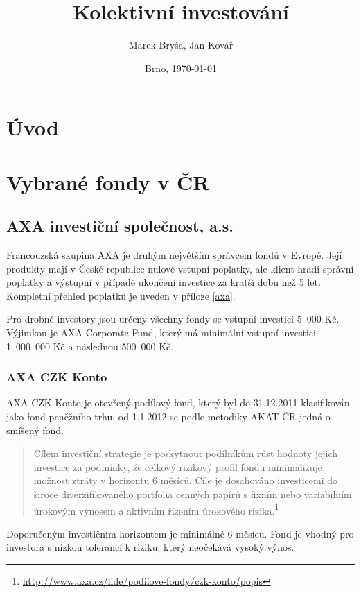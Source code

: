 \documentclass[a4paper,12pt]{article}
\title{Kolektivní investování}
\author{Marek Bryša, Jan Kovář}
\date{Brno, \today}
\begin{document}
\maketitle

\section{Úvod}

\section{Vybrané fondy v ČR}
	\subsection{AXA investiční společnost, a.s.}
		Francouzská skupina AXA je druhým největším správcem fondů v Evropě.\cite{axa_about} Její produkty mají v České republice nulové vstupní poplatky, ale klient hradí správní poplatky a výstupní v případě ukončení investice za kratší dobu než 5 let. Kompletní přehled poplatků je uveden v příloze \ref{axa}.
		
		Pro drobné investory jsou určeny všechny fondy se vstupní investicí 5~000 Kč. Výjimkou je AXA Corporate Fund, který má minimální vstupní investici 1~000~000 Kč a následnou 500~000 Kč.
		
		\subsubsection{AXA CZK Konto}
			AXA CZK Konto je otevřený podílový fond, který byl do 31.12.2011 klasifikován jako fond peněžního trhu, od 1.1.2012 se podle metodiky AKAT ČR jedná o smíšený fond.
			\begin{quote}
				Cílem investiční strategie je poskytnout podílníkům růst hodnoty jejich investice za podmínky, že celkový rizikový profil fondu minimalizuje možnost ztráty v horizontu 6 měsíců. Cíle je dosahováno investicemi do široce diverzifikovaného portfolia cenných papírů s fixním nebo variabilním úrokovým výnosem a aktivním řízením úrokového rizika.\footnote{\url{http://www.axa.cz/lide/podilove-fondy/czk-konto/popis}}
			\end{quote}
			
			Doporučeným investičním horizontem je minimálně 6 měsícu. Fond je vhodný pro investora s nízkou tolerancí k riziku, který neočekává vysoký výnos.
			
\end{document}
